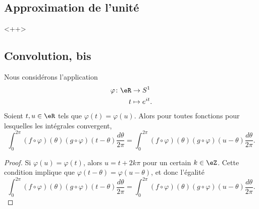\subsection{Approximation de l'unité}

<++>

\subsection{Convolution, bis}

\begin{lemma}       \label{LEMooLUBQooWLMFrN}
    Nous considérons l'application
    \begin{equation}
        \begin{aligned}
            \varphi\colon \eR&\to S^1 \\
            t&\mapsto e^{it}.
        \end{aligned}
    \end{equation}
    Soient \( t,u\in \eR\) tels que \( \varphi(t)=\varphi(u)\). Alors pour toutes fonctions pour lesquelles les intégrales convergent,
    \begin{equation}
        \int_0^{2\pi}(f\circ \varphi)(\theta)(g\circ\varphi)(t-\theta)\frac{ d\theta }{ 2\pi }=\int_0^{2\pi}(f\circ \varphi)(\theta)(g\circ\varphi)(u-\theta)\frac{ d\theta }{ 2\pi }.
    \end{equation}
\end{lemma}

\begin{proof}
    Si \( \varphi(u)=\varphi(t)\), alors \( u=t+2k\pi\) pour un certain \( k\in \eZ\). Cette condition implique que \( \varphi(t-\theta)=\varphi(u-\theta)\), et donc l'égalité 
    \begin{equation}
        \int_0^{2\pi}(f\circ \varphi)(\theta)(g\circ\varphi)(t-\theta)\frac{ d\theta }{ 2\pi }=\int_0^{2\pi}(f\circ \varphi)(\theta)(g\circ\varphi)(u-\theta)\frac{ d\theta }{ 2\pi }.
    \end{equation}
\end{proof}

